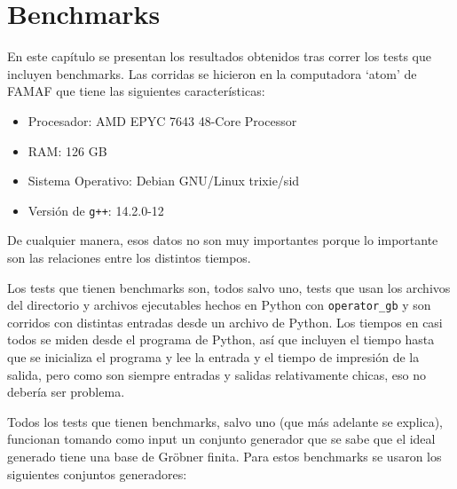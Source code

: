 \documentclass[12pt]{report}
\theoremstyle{customstyle}
\theoremstyle{factstyle}
\begin{document}
\chapter{Benchmarks}\label{cap:Benchmarks}

En este capítulo se presentan los resultados obtenidos tras correr los tests que incluyen benchmarks. Las corridas se hicieron en la computadora `atom' de FAMAF que tiene las siguientes características:

\begin{itemize}
  \item Procesador: AMD EPYC 7643 48-Core Processor
  \item RAM: 126 GB
  \item Sistema Operativo: Debian GNU/Linux trixie/sid
  \item Versión de \texttt{g++}: 14.2.0-12
\end{itemize}

De cualquier manera, esos datos no son muy importantes porque lo importante son las relaciones entre los distintos tiempos.

Los tests que tienen benchmarks son, todos salvo uno, tests que usan los archivos del directorio  y archivos ejecutables hechos en Python con \texttt{operator\_gb} y son corridos con distintas entradas desde un archivo de Python. Los tiempos en casi todos se miden desde el programa de Python, así que incluyen el tiempo hasta que se inicializa el programa y lee la entrada y el tiempo de impresión de la salida, pero como son siempre entradas y salidas relativamente chicas, eso no debería ser problema.

Todos los tests que tienen benchmarks, salvo uno (que más adelante se explica), funcionan tomando como input un conjunto generador que se sabe que el ideal generado tiene una base de Gröbner finita. Para estos benchmarks se usaron los siguientes conjuntos generadores:
\end{document}
